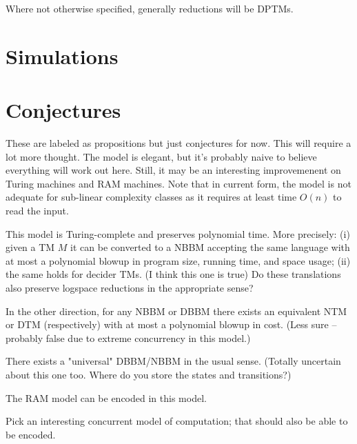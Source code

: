 \documentclass{article}
\begin{document}
Where not otherwise specified, generally reductions will be DPTMs.

\section{Simulations}







\section{Conjectures}


These are labeled as propositions but just conjectures for now.
This will require a lot more thought.
The model is elegant, but it's probably naive to believe everything will work out here.
Still, it may be an interesting improvemenent on Turing machines and RAM machines.
Note that in current form, the model is not adequate for sub-linear complexity classes as it requires at least time $O(n)$ to read the input.

\begin{proposition}
This model is Turing-complete and preserves polynomial time.
More precisely: (i) given a TM $M$ it can be converted to a NBBM accepting the same language with at most a polynomial blowup in program size, running time, and space usage; (ii) the same holds for decider TMs.
(I think this one is true)
Do these translations also preserve logspace reductions in the appropriate sense?
\end{proposition}

\begin{proposition}
In the other direction, for any NBBM or DBBM there exists an equivalent NTM or DTM (respectively) with at most a polynomial blowup in cost.
(Less sure -- probably false due to extreme concurrency in this model.)
\end{proposition}

\begin{proposition}
There exists a "universal" DBBM/NBBM in the usual sense.
(Totally uncertain about this one too. Where do you store the states and transitions?)
\end{proposition}

\begin{proposition}
The RAM model can be encoded in this model.
\end{proposition}

\begin{proposition}
Pick an interesting concurrent model of computation; that should also be able to be encoded.
\end{proposition}
% 



\end{document}
